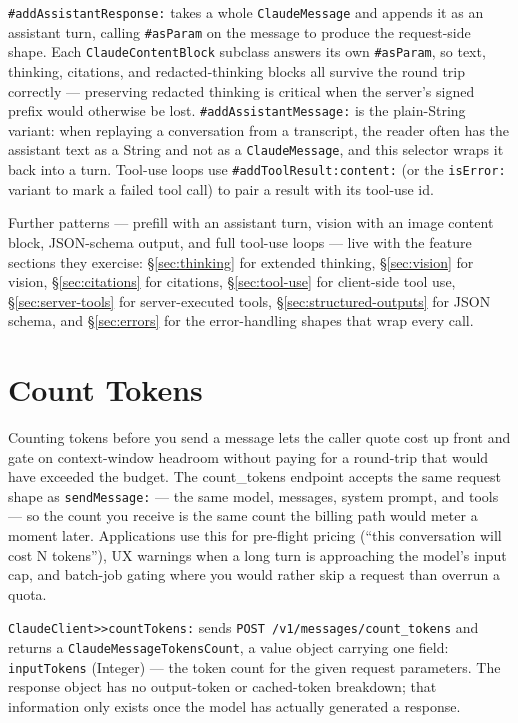 \documentclass[a4paper,10pt,fleqn]{article}
\newcommand{\cls}[1]{\texttt{#1}}
\newcommand{\sel}[1]{\texttt{\##1}}
\begin{document}
\sel{addAssistantResponse:} takes a whole \cls{ClaudeMessage}
and appends it as an assistant turn, calling \sel{asParam} on
the message to produce the request-side shape.  Each
\cls{ClaudeContentBlock} subclass answers its own \sel{asParam},
so text, thinking, citations, and redacted-thinking blocks all
survive the round trip correctly --- preserving redacted
thinking is critical when the server's signed prefix would
otherwise be lost.  \sel{addAssistantMessage:} is the
plain-String variant: when replaying a conversation from a
transcript, the reader often has the assistant text as a String
and not as a \cls{ClaudeMessage}, and this selector wraps it
back into a turn.  Tool-use loops use
\sel{addToolResult:content:} (or the \texttt{isError:} variant
to mark a failed tool call) to pair a result with its
tool-use id.

Further patterns --- prefill with an assistant turn, vision
with an image content block, JSON-schema output, and full
tool-use loops --- live with the feature sections they
exercise: \S\ref{sec:thinking} for extended thinking,
\S\ref{sec:vision} for vision, \S\ref{sec:citations} for
citations, \S\ref{sec:tool-use} for client-side tool use,
\S\ref{sec:server-tools} for server-executed tools,
\S\ref{sec:structured-outputs} for JSON schema, and
\S\ref{sec:errors} for the error-handling shapes that wrap
every call.

\medskip
{}

\section{Count Tokens}
\label{sec:count-tokens}

Counting tokens before you send a message lets the caller quote
cost up front and gate on context-window headroom without paying
for a round-trip that would have exceeded the budget.  The
count\_tokens endpoint accepts the same request shape as
\texttt{sendMessage:} --- the same model, messages, system prompt,
and tools --- so the count you receive is the same count the
billing path would meter a moment later.  Applications use this
for pre-flight pricing (``this conversation will cost N tokens''),
UX warnings when a long turn is approaching the model's input
cap, and batch-job gating where you would rather skip a request
than overrun a quota.

\begin{sloppypar}
\texttt{ClaudeClient>>countTokens:} sends \texttt{POST
/v1/messages/count\_tokens} and returns a
\texttt{ClaudeMessageTokensCount}, a value object carrying one
field: \texttt{inputTokens} (Integer) --- the token count for the
given request parameters.  The response object has no output-token
or cached-token breakdown; that information only exists once the
model has actually generated a response.
\end{sloppypar}
\end{document}
